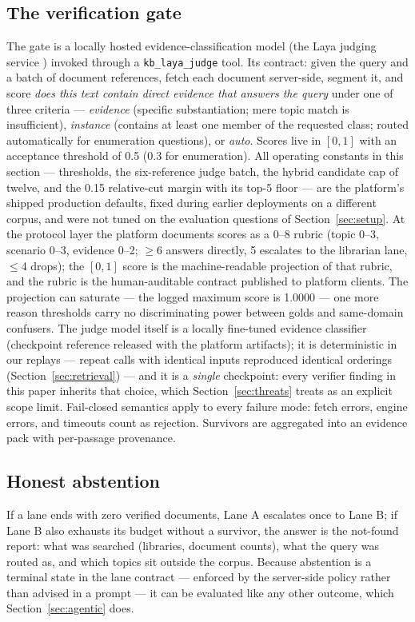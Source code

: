 \documentclass[preprint,12pt]{elsarticle}
\begin{document}
\subsection{The verification gate}
\label{sec:gate}
The gate is a locally hosted evidence-classification model (the Laya
judging service \cite{laya}) invoked through a
\texttt{kb\_laya\_judge} tool. Its contract: given the
query and a batch of document references, fetch each document server-side,
segment it, and score \emph{does this text contain direct evidence that
answers the query} under one of three criteria --- \emph{evidence}
(specific substantiation; mere topic match is insufficient),
\emph{instance} (contains at least one member of the requested class;
routed automatically for enumeration questions), or \emph{auto}. Scores
live in $[0,1]$ with an acceptance threshold of 0.5 (0.3 for enumeration).
All operating constants in this section --- thresholds, the six-reference
judge batch, the hybrid candidate cap of twelve, and the 0.15 relative-cut
margin with its top-5 floor --- are the platform's shipped production
defaults, fixed during earlier deployments on a different corpus, and were
not tuned on the evaluation questions of Section~\ref{sec:setup}. At the
protocol layer the platform documents scores as a 0--8 rubric (topic 0--3,
scenario 0--3, evidence 0--2; $\geq$6 answers directly, 5 escalates to the
librarian lane, $\leq$4 drops); the $[0,1]$ score is the machine-readable
projection of that rubric, and the rubric is the human-auditable contract
published to platform clients. The projection can saturate --- the logged
maximum score is 1.0000 --- one more reason thresholds carry no
discriminating power between golds and same-domain confusers. The judge
model itself is a locally
fine-tuned evidence classifier (checkpoint reference released with the
platform artifacts); it is deterministic in our replays --- repeat calls
with identical inputs reproduced identical orderings
(Section~\ref{sec:retrieval}) --- and it is a \emph{single} checkpoint:
every verifier finding in this paper inherits that choice, which
Section~\ref{sec:threats} treats as an explicit scope limit.
Fail-closed semantics apply to every
failure mode: fetch errors, engine errors, and timeouts count as
rejection. Survivors are aggregated into an evidence pack with
per-passage provenance.

\subsection{Honest abstention}
If a lane ends with zero verified documents, Lane A escalates once to Lane
B; if Lane B also exhausts its budget without a survivor, the answer is the
not-found report: what was searched (libraries, document counts), what the
query was routed as, and which topics sit outside the corpus. Because
abstention is a terminal state in the lane contract --- enforced by the
server-side policy rather than advised in a prompt --- it can be evaluated
like any other outcome, which Section~\ref{sec:agentic} does.
\end{document}
